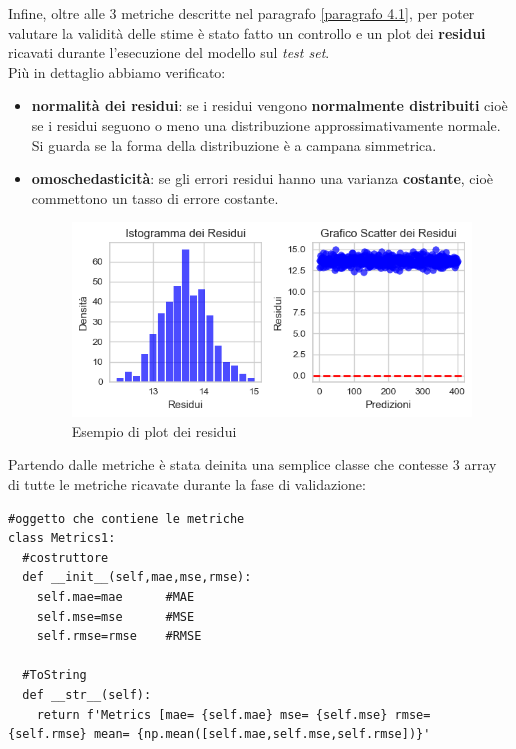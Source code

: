 Infine, oltre alle 3 metriche descritte nel paragrafo \ref{paragrafo 4.1}, per poter valutare la validità delle stime è stato fatto un controllo e un plot dei \textbf{residui} ricavati durante l'esecuzione del modello sul \textit{test set}. \\
Più in dettaglio abbiamo verificato:
\par{
\begin{itemize}
    \item \textbf{normalità dei residui}: se i residui vengono \textbf{normalmente distribuiti} cioè se i residui seguono o meno una distribuzione approssimativamente normale. Si guarda se la forma della distribuzione è a campana simmetrica.
    \item \textbf{omoschedasticità}: se gli errori residui hanno una varianza \textbf{costante}, cioè commettono un tasso di errore costante.
    \begin{figure}[H]
        \centering
        \includegraphics[width=1\linewidth]{plotresidui.png}
        \caption{Esempio di plot dei residui}
        \label{fig:enter-label}
    \end{figure}
\end{itemize}
}

Partendo dalle metriche è stata deinita una semplice classe che contesse 3 array di tutte le metriche ricavate durante la fase di validazione: \\
\begin{lstlisting}[caption=Classe Metrics1]
#oggetto che contiene le metriche
class Metrics1:
  #costruttore
  def __init__(self,mae,mse,rmse):
    self.mae=mae      #MAE
    self.mse=mse      #MSE
    self.rmse=rmse    #RMSE

  #ToString
  def __str__(self):
    return f'Metrics [mae= {self.mae} mse= {self.mse} rmse= {self.rmse} mean= {np.mean([self.mae,self.mse,self.rmse])}'
\end{lstlisting} 

